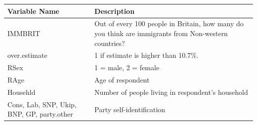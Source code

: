 \documentclass[]{article}
\begin{document}
\begin{longtable}[]{@{}ll@{}}
\toprule
\begin{minipage}[b]{0.11\columnwidth}\raggedright
Variable Name\strut
\end{minipage} & \begin{minipage}[b]{0.83\columnwidth}\raggedright
Description\strut
\end{minipage}\tabularnewline
\midrule
\endhead
\begin{minipage}[t]{0.11\columnwidth}\raggedright
IMMBRIT\strut
\end{minipage} & \begin{minipage}[t]{0.83\columnwidth}\raggedright
Out of every 100 people in Britain, how many do you think are immigrants from Non-western countries?\strut
\end{minipage}\tabularnewline
\begin{minipage}[t]{0.11\columnwidth}\raggedright
over.estimate\strut
\end{minipage} & \begin{minipage}[t]{0.83\columnwidth}\raggedright
1 if estimate is higher than 10.7\%.\strut
\end{minipage}\tabularnewline
\begin{minipage}[t]{0.11\columnwidth}\raggedright
RSex\strut
\end{minipage} & \begin{minipage}[t]{0.83\columnwidth}\raggedright
1 = male, 2 = female\strut
\end{minipage}\tabularnewline
\begin{minipage}[t]{0.11\columnwidth}\raggedright
RAge\strut
\end{minipage} & \begin{minipage}[t]{0.83\columnwidth}\raggedright
Age of respondent\strut
\end{minipage}\tabularnewline
\begin{minipage}[t]{0.11\columnwidth}\raggedright
Househld\strut
\end{minipage} & \begin{minipage}[t]{0.83\columnwidth}\raggedright
Number of people living in respondent's household\strut
\end{minipage}\tabularnewline
\begin{minipage}[t]{0.11\columnwidth}\raggedright
Cons, Lab, SNP, Ukip, BNP, GP, party.other\strut
\end{minipage} & \begin{minipage}[t]{0.83\columnwidth}\raggedright
Party self-identification\strut

\end{minipage}
\end{longtable}
\end{document}
